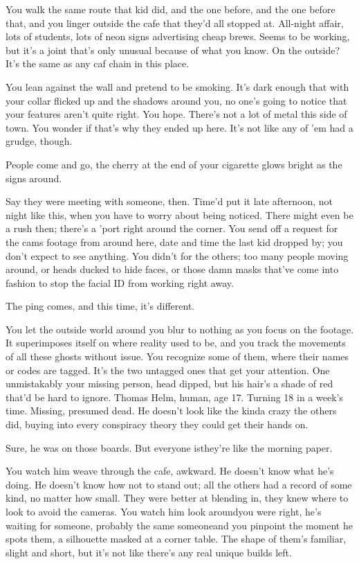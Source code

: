 You walk the same route that kid did, and the one before, and the one before that, and you linger outside the cafe that they'd all stopped at. All-night affair, lots of students, lots of neon signs advertising cheap brews. Seems to be working, but it's a joint that's only unusual because of what you know. On the outside? It's the same as any caf chain in this place.

You lean against the wall and pretend to be smoking. It's dark enough that with your collar flicked up and  the shadows around you, no one's going to notice that your features aren't quite right. You hope. There's not a lot of metal this side of town. You wonder if that's why they ended up here. It's not like any of 'em had a grudge, though. 

People come and go, the cherry at the end of your cigarette glows bright as the signs around. 

Say they were meeting with someone, then. Time'd put it late afternoon, not night like this, when you have to worry about being noticed. There might even be a rush then; there's a 'port right around the corner. You send off a request for the cams footage from around here, date and time the last kid dropped by; you don't expect to see anything. You didn't for the others; too many people moving around, or heads ducked to hide faces, or those damn masks that've come into fashion to stop the facial ID from working right away.

The ping comes, and this time, it's different. 

You let the outside world around you blur to nothing as you focus on the footage. It superimposes itself on where reality used to be, and you track the movements of all these ghosts without issue. You recognize some of them, where their names or codes are tagged. It's the two untagged ones that get your attention. One unmistakably your missing person, head dipped, but his hair's a shade of red that'd be hard to ignore. Thomas Helm, human, age 17. Turning 18 in a week's time. Missing, presumed dead. He doesn't look like the kinda crazy the others did, buying into every conspiracy theory they could get their hands on.

Sure, he was on those boards. But everyone is\textemdash they're like the morning paper.

You watch him weave through the cafe, awkward. He doesn't know what he's doing. He doesn't know how not to stand out; all the others had a record of some kind, no matter how small. They were better at blending in, they knew where to look to avoid the cameras. You watch him look around\textemdash you were right, he's waiting for someone, probably the same someone\textemdash and you pinpoint the moment he spots them, a silhouette masked at a corner table. The shape of them's familiar, slight and short, but it's not like there's any real unique builds left.

